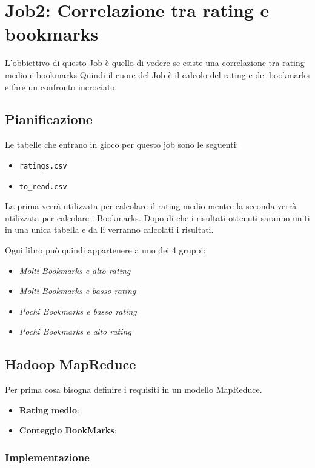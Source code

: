 \section{Job2: Correlazione tra rating e bookmarks}

L'obbiettivo di questo Job è quello di vedere se esiste una correlazione tra rating medio e bookmarks
Quindi il cuore del Job è il calcolo del rating e dei bookmarks e fare un confronto incrociato.

\subsection{Pianificazione}
Le tabelle che entrano in gioco per questo job sono le seguenti:
\begin{itemize}
    \item \texttt{ratings.csv}
    \item \texttt{to\_read.csv}
\end{itemize}

La prima verrà utilizzata per calcolare il rating medio mentre la seconda verrà utilizzata per calcolare i Bookmarks.
Dopo di che i risultati ottenuti saranno uniti in una unica tabella e da li verranno calcolati i risultati.

Ogni libro può quindi appartenere a uno dei 4 gruppi:
\begin{itemize}
    \item \textit{Molti Bookmarks e alto rating}
    \item \textit{Molti Bookmarks e basso rating}
    \item \textit{Pochi Bookmarks e basso rating}
    \item \textit{Pochi Bookmarks e alto rating}
\end{itemize}

\subsection{Hadoop MapReduce}

Per prima cosa bisogna definire i requisiti in un modello MapReduce.
\begin{itemize}
    \item \textbf{Rating medio}: %
    \item \textbf{Conteggio BookMarks}: %
\end{itemize}

\subsubsection{Implementazione}
